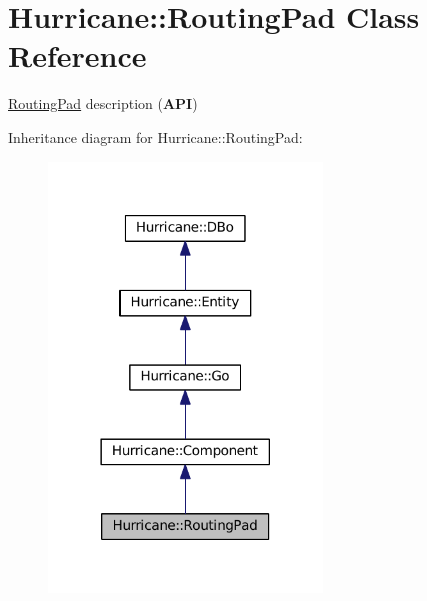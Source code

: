 \hypertarget{classHurricane_1_1RoutingPad}{}\section{Hurricane\+:\+:Routing\+Pad Class Reference}
\label{classHurricane_1_1RoutingPad}


\mbox{\hyperlink{classHurricane_1_1RoutingPad}{Routing\+Pad}} description ({\bfseries A\+PI})  




Inheritance diagram for Hurricane\+:\+:Routing\+Pad\+:\nopagebreak
\begin{figure}[H]
\begin{center}
\leavevmode
\includegraphics[width=206pt]{classHurricane_1_1RoutingPad__inherit__graph}
\end{center}
\end{figure}
